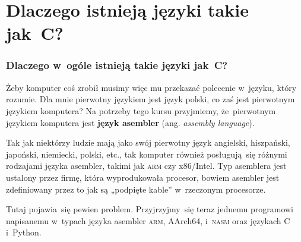 \documentclass[10pt,t]{beamer}
\begin{document}





















\section{Dlaczego istnieją języki takie jak~C?}



\begin{frame}
  \frametitle{Dlaczego w~ogóle istnieją takie języki jak~C?}

  \pause


  Żeby komputer coś zrobił musimy więc mu przekazać polecenie w~języku,
  który rozumie. Dla mnie pierwotny językiem jest język polski, co zaś
  jest pierwotnym językiem komputera? Na potrzeby tego kursu przyjmiemy,
  że~pierwotnym językiem komputera jest \textbf{język asembler}
  (ang. \textit{assembly language}).

  Tak jak niektórzy ludzie mają jako swój pierwotny język angielski,
  hiszpański, japoński, niemiecki, polski, etc., tak komputer również
  posługują~się różnymi rodzajami języka asembler, takimi jak \textsc{arm}
  czy x86/Intel. Typ asemblera jest ustalony przez firmę, która
  wyprodukowała procesor, bowiem asembler jest zdefiniowany przez to jak są
  „podpięte kable” w~rzeczonym procesorze.

  Tutaj pojawia~się pewien problem. Przyjrzyjmy~się teraz jednemu programowi
  napisanemu w~typach języka asembler \textsc{arm}, AArch64,
  i~\textsc{nasm} oraz językach C i~Python.

\end{frame}
\end{document}
